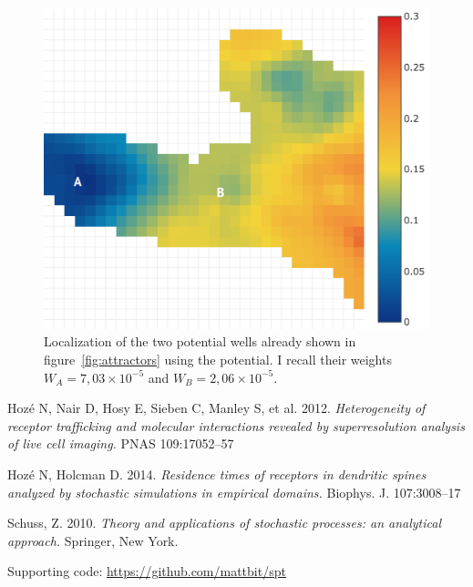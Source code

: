 \documentclass[a4paper]{article}
\begin{document}
\begin{figure}[ht]
  \includegraphics[width=\linewidth]{img/04_attractors.png}
  \caption{Localization of the two potential wells already shown in figure~\ref{fig:attractors} using the potential. I recall their weights $W_A = 7,03 \times 10^{-5}$ and $W_B = 2,06 \times 10^{-5}$. }
  \label{fig:potential-attractors}
\end{figure}

\begin{thebibliography}{9}
Hoz\'e N, Nair D, Hosy E, Sieben C, Manley S, et al. 2012. \textit{Heterogeneity of receptor trafficking and molecular interactions revealed by superresolution analysis of live cell imaging.} PNAS 109:17052–57

Hoz\'e N, Holcman D. 2014. \textit{Residence times of receptors in dendritic spines analyzed by stochastic simulations in empirical domains.} Biophys. J. 107:3008–17

Schuss, Z. 2010. \textit{Theory and applications of stochastic processes: an analytical approach.} Springer, New York.

Supporting code: \href{https://github.com/mattbit/spt}{https://github.com/mattbit/spt}

\end{thebibliography}
\end{document}
